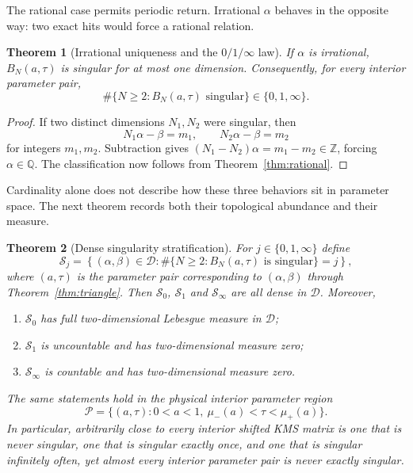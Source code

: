 \documentclass[11pt,reqno]{amsart}
\theoremstyle{plain}
\newtheorem{theorem}{Theorem}
\theoremstyle{definition}
\newcommand{\BN}{B_N}
\newcommand{\Z}{\mathbb{Z}}
\newcommand{\Q}{\mathbb{Q}}
\begin{document}
The rational case permits periodic return.  Irrational $\alpha$ behaves in the
opposite way: two exact hits would force a rational relation.

\begin{theorem}[Irrational uniqueness and the $0/1/\infty$ law]\label{thm:zeroinf}
If $\alpha$ is irrational, $\BN(a,\tau)$ is singular for at most one dimension.
Consequently, for every interior parameter pair,
\begin{equation}\label{eq:card}
\boxed{
\#\{N\ge2:\BN(a,\tau)\text{ singular}\}\in\{0,1,\infty\}.}
\end{equation}
\end{theorem}

\begin{proof}
If two distinct dimensions $N_1,N_2$ were singular, then
\[
N_1\alpha-\beta=m_1,
\qquad
N_2\alpha-\beta=m_2
\]
for integers $m_1,m_2$.  Subtraction gives
$(N_1-N_2)\alpha=m_1-m_2\in\Z$, forcing $\alpha\in\Q$.  The classification now
follows from Theorem~\ref{thm:rational}.
\end{proof}

Cardinality alone does not describe how these three behaviors sit in parameter
space.  The next theorem records both their topological abundance and their measure.

\begin{theorem}[Dense singularity stratification]\label{thm:dense-strata}
For $j\in\{0,1,\infty\}$ define
\[
\mathcal S_j=\left\{(\alpha,\beta)\in\mathcal D:
\#\{N\ge2:B_N(a,\tau)\text{ is singular}\}=j\right\},
\]
where $(a,\tau)$ is the parameter pair corresponding to $(\alpha,\beta)$ through
Theorem~\ref{thm:triangle}.  Then $\mathcal S_0$, $\mathcal S_1$ and
$\mathcal S_\infty$ are all dense in $\mathcal D$.  Moreover,
\begin{enumerate}
\item $\mathcal S_0$ has full two-dimensional Lebesgue measure in $\mathcal D$;
\item $\mathcal S_1$ is uncountable and has two-dimensional measure zero;
\item $\mathcal S_\infty$ is countable and has two-dimensional measure zero.
\end{enumerate}
The same statements hold in the physical interior parameter region
\[
\mathcal P=\{(a,\tau):0<a<1,\ \mu_-(a)<\tau<\mu_+(a)\}.
\]
In particular, arbitrarily close to every interior shifted KMS matrix is one that is
never singular, one that is singular exactly once, and one that is singular infinitely
often, yet almost every interior parameter pair is never exactly singular.
\end{theorem}
\end{document}

